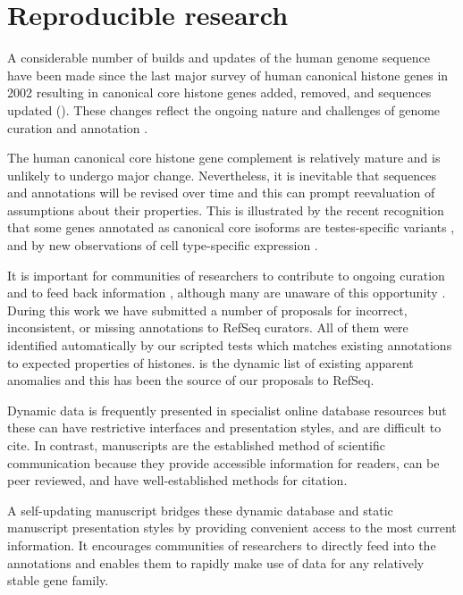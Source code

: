 \section{Reproducible research}
\label{sec:reproducible}

  A considerable number of builds and updates of the human genome sequence have been made
  since the last major survey of human canonical histone genes in 2002 \citep{Marzluff02}
  resulting in
  \AddedSinceReference{} canonical core histone genes added,
  \RemovedSinceReference{} removed,
  and \SequencesUpdatedSinceReference{}
  sequences updated ().
  These changes reflect the ongoing nature and challenges of
  genome curation and annotation \citep{BorkKoonin1998}.

  The human canonical core histone gene complement is relatively mature
  and is unlikely to undergo major change.
  Nevertheless, it is inevitable that sequences and annotations will be revised over time
  and this can prompt reevaluation of assumptions about their properties.
  This is illustrated by the recent recognition that
  some genes annotated as canonical core isoforms are testes-specific variants \citep{Talbert2012},
  and by new observations of cell type-specific expression \citep{Molden2015}.

  It is important for communities of researchers to contribute
  to ongoing curation and to feed back information \citep{SteinNRG2001},
  although many are unaware of this opportunity \citep{HollidaySPR2015}.
  During this work we have submitted a number
  of proposals for incorrect, inconsistent, or missing annotations
  to RefSeq curators.  All of them were identified automatically
  by our scripted tests which matches existing
  annotations to expected properties of histones.
   is the dynamic list of existing apparent
  anomalies and this has been the source of our proposals to RefSeq.

  Dynamic data is frequently presented in specialist online database resources
  but these can have restrictive interfaces and presentation styles, and are difficult to cite.
  In contrast, manuscripts are the established method of scientific communication
  because they provide accessible information for readers, can be peer reviewed,
  and have well-established methods for citation.

  A self-updating manuscript bridges these dynamic database and static manuscript
  presentation styles by providing convenient access to the most current information.
  It encourages communities of researchers to directly feed into the annotations
  and enables them to rapidly make use of data for any relatively stable gene family.

